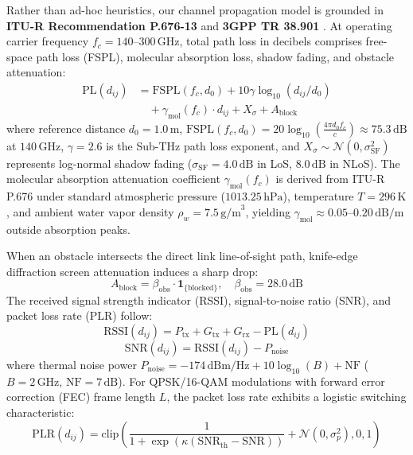 \documentclass[conference]{IEEEtran}
\begin{document}
Rather than ad-hoc heuristics, our channel propagation model is grounded in \textbf{ITU-R Recommendation P.676-13} \cite{itur2022p676} and \textbf{3GPP TR 38.901} \cite{3gpp2022tr38901}. At operating carrier frequency $f_c = 140\text{--}300\,\text{GHz}$, total path loss in decibels comprises free-space path loss (FSPL), molecular absorption loss, shadow fading, and obstacle attenuation:
\begin{equation}
\begin{aligned}
\text{PL}(d_{ij}) &= \text{FSPL}(f_c, d_0) + 10 \gamma \log_{10}(d_{ij}/d_0) \\
&\quad + \gamma_{\text{mol}}(f_c) \cdot d_{ij} + X_\sigma + A_{\text{block}}
\end{aligned}
\label{eq:pathloss}
\end{equation}
where reference distance $d_0 = 1.0\,\text{m}$, $\text{FSPL}(f_c, d_0) = 20 \log_{10}\left(\frac{4 \pi d_0 f_c}{c}\right) \approx 75.3\,\text{dB}$ at $140\,\text{GHz}$, $\gamma = 2.6$ is the Sub-THz path loss exponent, and $X_\sigma \sim \mathcal{N}(0, \sigma_{\text{SF}}^2)$ represents log-normal shadow fading ($\sigma_{\text{SF}} = 4.0\,\text{dB}$ in LoS, $8.0\,\text{dB}$ in NLoS). The molecular absorption attenuation coefficient $\gamma_{\text{mol}}(f_c)$ is derived from ITU-R P.676 under standard atmospheric pressure ($1013.25\,\text{hPa}$), temperature $T = 296\,\text{K}$, and ambient water vapor density $\rho_w = 7.5\,\text{g/m}^3$, yielding $\gamma_{\text{mol}} \approx 0.05\text{--}0.20\,\text{dB/m}$ outside absorption peaks.

When an obstacle intersects the direct link line-of-sight path, knife-edge diffraction screen attenuation induces a sharp drop:
\begin{equation}
A_{\text{block}} = \beta_{\text{obs}} \cdot \mathbf{1}_{\{\text{blocked}\}}, \quad \beta_{\text{obs}} = 28.0\,\text{dB}
\end{equation}
The received signal strength indicator (RSSI), signal-to-noise ratio (SNR), and packet loss rate (PLR) follow:
\begin{equation}
\text{RSSI}(d_{ij}) = P_{\text{tx}} + G_{\text{tx}} + G_{\text{rx}} - \text{PL}(d_{ij})
\end{equation}
\begin{equation}
\text{SNR}(d_{ij}) = \text{RSSI}(d_{ij}) - P_{\text{noise}}
\end{equation}
where thermal noise power $P_{\text{noise}} = -174\,\text{dBm/Hz} + 10\log_{10}(B) + \text{NF}$ ($B = 2\,\text{GHz}$, $\text{NF} = 7\,\text{dB}$). For QPSK/16-QAM modulations with forward error correction (FEC) frame length $L$, the packet loss rate exhibits a logistic switching characteristic:
\begin{equation}
\text{PLR}(d_{ij}) = \text{clip}\left(\frac{1}{1 + \exp(\kappa(\text{SNR}_{\text{th}} - \text{SNR}))} + \mathcal{N}(0, \sigma_p^2), 0, 1\right)
\end{equation}
\end{document}
